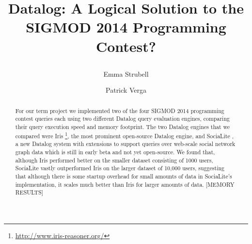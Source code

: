 \documentclass{article}
\title{
\LARGE\bf Datalog: A Logical Solution to the SIGMOD 2014 Programming Contest? \\
\date{}
\author{ Emma Strubell \and Patrick Verga}
}
\begin{document}
\maketitle

\begin{abstract}
For our term project we implemented two of the four SIGMOD 2014 programming contest queries each using two different Datalog query evaluation engines, comparing their query execution speed and memory footprint. The two Datalog engines that we compared were Iris \footnote{\protect\url{http://www.iris-reasoner.org/}}, the most prominent open-source Datalog engine, and SociaLite \cite{seo-et-al-13a}, a new Datalog system with extensions to support queries over web-scale social network graph data which is still in early beta and not yet open-source. We found that, although Iris performed better on the smaller dataset consisting of 1000 users, SociaLite vastly outperformed Iris on the larger dataset of 10,000 users, suggesting that although there is some startup overhead for small amounts of data in SociaLite's implementation, it scales much better than Iris for larger amounts of data. [MEMORY RESULTS]
\end{abstract}

\thispagestyle{fancy}
\end{document}
